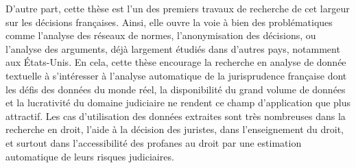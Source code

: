 D'autre part, cette thèse est l'un des premiers travaux de recherche de cet largeur sur les décisions françaises. Ainsi, elle ouvre la voie à bien des problématiques comme l'analyse des réseaux de normes, l'anonymisation des décisions, ou l'analyse des arguments, déjà largement étudiés dans d'autres pays, notamment aux États-Unis. En cela, cette thèse encourage la recherche en analyse de donnée textuelle à s'intéresser à l'analyse automatique de la jurisprudence française dont les défis des données du monde réel, la disponibilité du grand volume de données et la lucrativité du domaine judiciaire ne rendent ce champ d'application que plus attractif. Les cas d'utilisation des données extraites sont très nombreuses dans la recherche en droit, l'aide à la décision des juristes, dans l'enseignement du droit, et surtout dans l'accessibilité des profanes au droit par une estimation automatique de leurs risques judiciaires.
